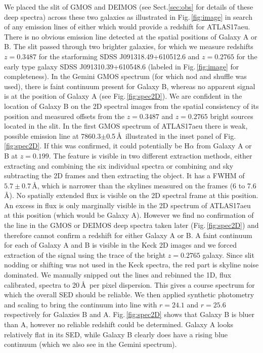 \documentclass[twocolumn]{aastex61}
\begin{document}
We placed the slit of GMOS and DEIMOS (see Sect.\ref{sec:obs} for details of these deep spectra) across
these two galaxies as illustrated in Fig.\,\ref{fig:image} in search 
of any emission lines of either which would provide a redshift for 
ATLAS17aeu. There is no obvious emission line detected at the spatial 
positions of Galaxy A or B. The slit passed through two brighter galaxies, for which we measure 
redshifts $z=0.3487$ for the starforming SDSS J091318.49+610512.6
and 
$z=0.2765$
for the early type galaxy SDSS J091310.39+610548.6
(labeled in Fig.\,\ref{fig:image} for completeness).
In the Gemini GMOS spectrum (for which nod and shuffle was used),    there is faint continuum present for Galaxy B, whereas no apparent signal is 
at the position of Galaxy A (see Fig.\,\ref{fig:spec2D}). 
 We are confident in the location of Galaxy B on the 
2D spectral images from the spatial consistency of its position and measured offsets
from the $z=0.3487$ and  $z=0.2765$
bright sources located in the slit.  In the first GMOS spectrum of
ATLAS17aeu there is weak, possible emission line at 7860.3$\pm$0.5\,\AA\ 
illustrated in the inset panel of  Fig.\,\ref{fig:spec2D}. 
If this was confirmed, it could potentially be H$\alpha$ from Galaxy A or B at $z=0.199$. The feature is visible in two different extraction methods, 
either extracting and combining the six individual spectra or combining and 
sky subtracting the 2D frames and then extracting the object. It has 
a FWHM of $5.7\pm0.7$\,\AA, which is narrower than the skylines measured on the
frames (6 to 7.6\,\AA).  No spatially extended 
flux is  visible on the 2D spectral frame at this position.  
An excess in flux is only marginally visible in the 2D 
spectrum of ATLAS17aeu at this position (which would be 
Galaxy A). 
However we find no confirmation of the line 
in the GMOS or DEIMOS deep spectra taken later (Fig.\,\ref{fig:spec2D}) and therefore
cannot confirm a redshift for either Galaxy A or B.
A faint continuum for each of Galaxy A and B is visible in the Keck 2D images and we forced extraction of the signal using the trace of the bright $z=0.2765$ galaxy. Since slit nodding or shifting was not used in the Keck spectra, the red part is skyline noise dominated. We manually snipped out the lines and rebinned the 1D, flux calibrated, spectra to 20\,\AA\ per pixel dispersion. This gives a course spectrum for which the overall SED should be reliable. We then applied synthetic photometry and scaling to bring the continuum into line with $r=24.1$ and $r=25.6$ respectively for Galaxies B and A.    
Fig.\,\ref{fig:spec2D} shows that Galaxy B is bluer than A, however no reliable redshift could be determined. Galaxy A looks relatively flat in its SED, while Galaxy B clearly does have a rising blue continuum (which we also see in the Gemini spectrum). 
\end{document}
